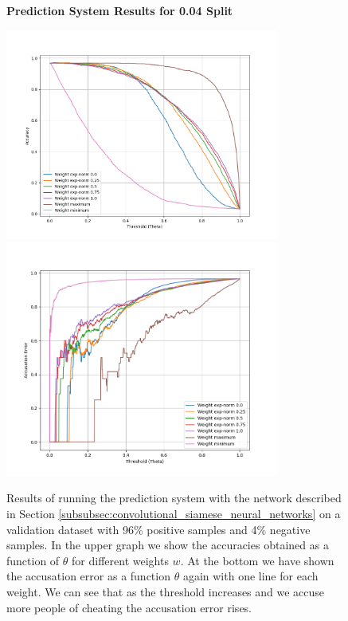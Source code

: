 \begin{figure}
    \centering
    \textbf{Prediction System Results for 0.04 Split}\par\medskip
    \includegraphics[width=0.8\textwidth]{./pictures/experiments/network6_prediction_system_accuracies_4_percent.png}
    \includegraphics[width=0.8\textwidth]{./pictures/experiments/network6_prediction_system_accusation_error_4_percent.png}
    \caption{Results of running the prediction system with the network described
        in Section \ref{subsubsec:convolutional_siamese_neural_networks} on a
        validation dataset with 96\% positive samples and 4\% negative samples.
        In the upper graph we show the accuracies obtained as a function of
        $\theta$ for different weights $w$. At the bottom we have shown the
        accusation error as a function $\theta$ again with one line for each
        weight. We can see that as the threshold increases and we accuse more
        people of cheating the accusation error rises.}
    \label{fig:prediction_system_results_4}
\end{figure}

